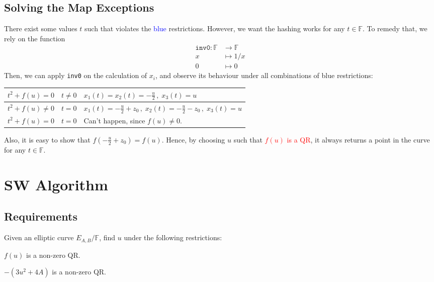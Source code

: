 \documentclass[letterpaper,11pt]{article}
\begin{document}
\subsection{Solving the Map Exceptions}
There exist some values $t$ such that violates the \textcolor{blue}{blue} restrictions. However, we want the hashing works for any $t\in\mathbb{F}$. To remedy that, we rely on the function
\begin{equation}
 \begin{aligned}
\texttt{inv0}\colon \mathbb{F}&\rightarrow\mathbb{F}\\
x&\mapsto 1/x \\
0&\mapsto 0
 \end{aligned}
\end{equation}
Then, we can apply \texttt{inv0} on the calculation of $x_i$, and observe its behaviour under all combinations of blue restrictions:
\begin{center}
\begin{tabular}{l|l|l}
 $t^2+f(u)   = 0$ & $t\neq 0 $ & $x_1(t)=x_2(t)=-\frac{u}{2}\,,\;x_3(t)=u$ \\[7pt] \hline
 $t^2+f(u)\neq 0$ & $t   = 0 $ & $x_1(t)=-\frac{u}{2}+z_0\,,\;x_2(t)=-\frac{u}{2}-z_0\,,\;x_3(t)=u$ \\[7pt] \hline
 $t^2+f(u)   = 0$ & $t   = 0 $ & Can't happen, since $f(u)\neq0$. \\
\end{tabular}
\end{center}
Also, it is easy to show that $f(-\frac{u}{2}+z_0) = f(u)$.
Hence, by choosing $u$ such that \textcolor{red}{$f(u)$ is a QR}, it always returns a point in the curve for any $t\in\mathbb{F}$.

\section{SW Algorithm}

\subsection{Requirements}
Given an elliptic curve $E_{A,B}/\mathbb{F}$, find $u$ under the following restrictions:
\begin{itemize}
\begin{multicols}{2}
 \item $f(u)$ is a non-zero QR.
 \item $-(3u^2+4A)$  is a non-zero QR.
\end{multicols}
\end{itemize}
\end{document}
